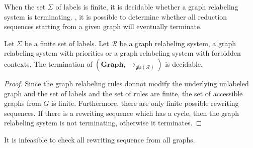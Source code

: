 \color{red}
  When the set $\Sigma$ of labels is finite, it is decidable whether a graph relabeling system is terminating.
, it is possible to determine whether all reduction sequences starting from a given graph will eventually terminate. 

\begin{proposition}
  Let $\Sigma$ be a finite set of labels.  Let $\mathcal{R}$ be a graph relabeling system, a graph relabeling system with priorities or a graph relabeling system with forbidden contexts. The termination of $(\textbf{Graph}, \mathop{\to} _{\mathfrak{gls(\mathcal{R})}})$ is decidable.
  \end{proposition}
  \begin{proof}
     Since the graph relabeling rules donnot modify the underlying unlabeled graph and the set of labels and the set of rules are finite, the set of accessible graphs from $G$ is finite. Furthermore, there are only finite possible rewriting sequences. If there is a rewriting sequence which has a cycle, then the graph relabeling system is not terminating, otherwise it terminates.
  \end{proof}

\begin{remark}
  It is infeasible to check all rewriting sequence from all graphs.
\end{remark}
\color{black}